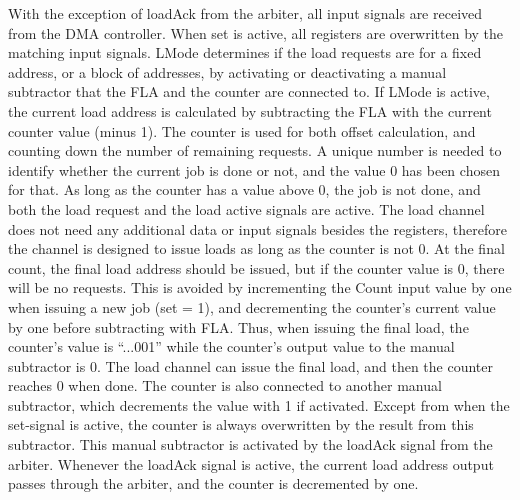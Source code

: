 \begin{appendix}
With the exception of loadAck from the arbiter, all input signals are received from the DMA controller.
When set is active, all registers are overwritten by the matching input signals.
LMode determines if the load requests are for a fixed address, or a block of addresses, by activating or deactivating a manual subtractor that the FLA and the counter are connected to.
If LMode is active, the current load address is calculated by subtracting the FLA with the current counter value (minus 1).
The counter is used for both offset calculation, and counting down the number of remaining requests.
A unique number is needed to identify whether the current job is done or not, and the value 0 has been chosen for that.
As long as the counter has a value above 0, the job is not done, and both the load request and the load active signals are active.
The load channel does not need any additional data or input signals besides the registers, therefore the channel is designed to issue loads as long as the counter is not 0.
At the final count, the final load address should be issued, but if the counter value is 0, there will be no requests.
This is avoided by incrementing the Count input value by one when issuing a new job (set = 1), and decrementing the counter's current value by one before subtracting with FLA.
Thus, when issuing the final load, the counter's value is ``...001'' while the counter's output value to the manual subtractor is 0.
The load channel can issue the final load, and then the counter reaches 0 when done.
The counter is also connected to another manual subtractor, which decrements the value with 1 if activated.
Except from when the set-signal is active, the counter is always overwritten by the result from this subtractor.
This manual subtractor is activated by the loadAck signal from the arbiter.
Whenever the loadAck signal is active, the current load address output passes through the arbiter, and the counter is decremented by one.


\end{appendix}
